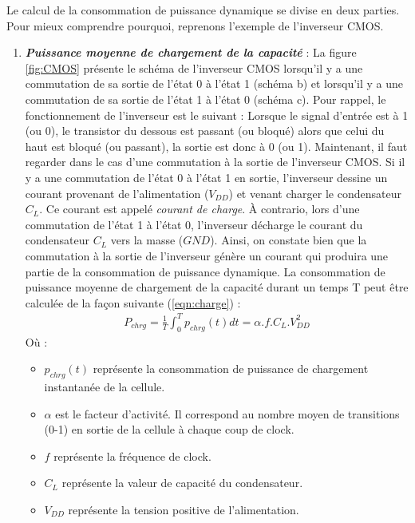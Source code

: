 \documentclass[10pt, oneside, a4paper]{article}
\begin{document}
\vspace{+0.5 cm}\hspace{-0.5 cm}

Le calcul de la consommation de puissance dynamique se divise en deux parties. Pour mieux comprendre pourquoi, reprenons l'exemple de l'inverseur CMOS.

\begin{enumerate}
\vspace{-0.2 cm}\item \textbf{\textit{Puissance moyenne de chargement de la capacité}} : La figure \ref{fig:CMOS} présente le schéma de l'inverseur CMOS lorsqu'il y a une commutation de sa sortie de l'état 0 à l'état 1 (schéma b) et lorsqu'il y a une commutation de sa sortie de l'état 1 à l'état 0 (schéma c). Pour rappel, le fonctionnement de l'inverseur est le suivant : Lorsque le signal d'entrée est à 1 (ou 0), le transistor du dessous est passant (ou bloqué) alors que celui du haut est bloqué (ou passant), la sortie est donc à 0 (ou 1). Maintenant, il faut regarder dans le cas d'une commutation à la sortie de l'inverseur CMOS. Si il y a une commutation de l'état 0 à l'état 1 en sortie, l'inverseur dessine un courant provenant de l'alimentation ($V_{DD}$) et venant charger le condensateur $C_L$. Ce courant est appelé \textit{courant de charge}. À contrario, lors d'une commutation de l'état 1 à l'état 0, l'inverseur décharge le courant du condensateur $C_L$ vers la masse ($GND$). Ainsi, on constate bien que la commutation à la sortie de l'inverseur génère un courant qui produira une partie de la consommation de puissance dynamique. La consommation de puissance moyenne de chargement de la capacité durant un temps T peut être calculée de la façon suivante (\ref{eqn:charge}) :
\begin{gather}
	P_{chrg} = \frac{1}{T}\int_{0}^{T}p_{chrg}(t)dt=\alpha.f.C_{L}.V_{DD}^{2}\label{eqn:charge}
\end{gather}
Où :
\begin{itemize}
\item $p_{chrg}(t)$ représente la consommation de puissance de chargement instantanée de la cellule.
\item $\alpha$ est le facteur d'activité. Il correspond au nombre moyen de transitions (0-1) en sortie de la cellule à chaque coup de clock.
\item $f$ représente la fréquence de clock.
\item $C_L$ représente la valeur de capacité du condensateur.
\item $V_{DD}$ représente la tension positive de l'alimentation. \\
\end{itemize}



\end{enumerate}
\end{document}
